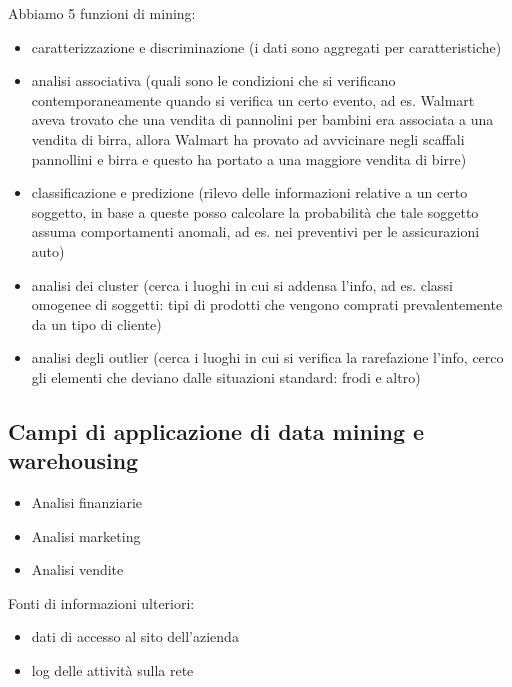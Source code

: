 Abbiamo 5 funzioni di mining:

\begin{itemize}

\item
  caratterizzazione e discriminazione (i dati sono aggregati per
  caratteristiche)
\item
  analisi associativa (quali sono le condizioni che si verificano
  contemporaneamente quando si verifica un certo evento, ad es. Walmart
  aveva trovato che una vendita di pannolini per bambini era associata a
  una vendita di birra, allora Walmart ha provato ad avvicinare negli
  scaffali pannollini e birra e questo ha portato a una maggiore vendita
  di birre)
\item
  classificazione e predizione (rilevo delle informazioni relative a un
  certo soggetto, in base a queste posso calcolare la probabilit\`a che
  tale soggetto assuma comportamenti anomali, ad es. nei preventivi per
  le assicurazioni auto)
\item
  analisi dei cluster (cerca i luoghi in cui si addensa l'info, ad es.
  classi omogenee di soggetti: tipi di prodotti che vengono comprati
  prevalentemente da un tipo di cliente)
\item
  analisi degli outlier (cerca i luoghi in cui si verifica la
  rarefazione l'info, cerco gli elementi che deviano dalle situazioni
  standard: frodi e altro)
\end{itemize}

\subsection{Campi di applicazione di data mining e
warehousing}\label{campi-di-applicazione-di-data-mining-e-warehousing}

\begin{itemize}

\item
  Analisi finanziarie
\item
  Analisi marketing
\item
  Analisi vendite
\end{itemize}

Fonti di informazioni ulteriori:

\begin{itemize}

\item
  dati di accesso al sito dell'azienda
\item
  log delle attivit\`a sulla rete
\end{itemize}

